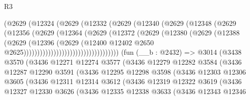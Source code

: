 \begin{lexlean}{R3}
\begin{coremodule}
                              (@2629
                                (@12324
                                  (@2629
                                    (@12332
                                      (@2629
                                        (@12340
                                          (@2629
                                            (@12348
                                              (@2629
                                                (@12356
                                                  (@2629
                                                    (@12364
                                                      (@2629
                                                        (@12372
                                                          (@2629
                                                            (@12380
                                                              (@2629
                                                                (@12388
                                                                  (@2629
                                                                    (@12396
                                                                      (@2629
                                                                        (@12400
                                                                          @12402
                                                                          @2650
                                                                          @2625)))))))))))))))))))))))))))))))))))
    (fun (__b : @2432) =>
    @3014
      (@3438
        @3570
        (@3436
          @12271
          @12274
          @3577
          (@3436
            @12279
            @12282
            @3584
            (@3436
              @12287
              @12290
              @3591
              (@3436
                @12295
                @12298
                @3598
                (@3436
                  @12303
                  @12306
                  @3605
                  (@3436
                    @12311
                    @12314
                    @3612
                    (@3436
                      @12319
                      @12322
                      @3619
                      (@3436
                        @12327
                        @12330
                        @3626
                        (@3436
                          @12335
                          @12338
                          @3633
                          (@3436
                            @12343
                            @12346

\end{coremodule}
\end{lexlean}
